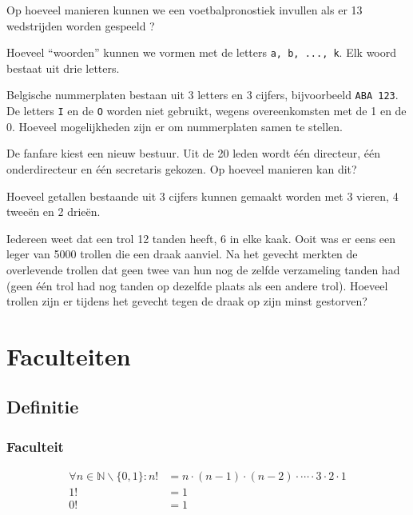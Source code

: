 \documentclass[12pt,a4paper,twoside]{article}
\begin{document}
\begin{oefening}
Op hoeveel manieren kunnen we een voetbalpronostiek invullen als er 13
wedstrijden worden gespeeld ?
\end{oefening}

\begin{oefening}
Hoeveel “woorden” kunnen we vormen met de letters \texttt{a, b, ..., k}. Elk woord
bestaat uit drie letters.
\end{oefening}

\begin{oefening}
Belgische nummerplaten bestaan uit 3 letters en 3 cijfers, bijvoorbeeld \texttt{ABA 123}. De letters \texttt{I} en de \texttt{O} worden niet gebruikt, wegens overeenkomsten met de 1 en de 0. Hoeveel mogelijkheden zijn er om nummerplaten samen te stellen.
\end{oefening}

\begin{oefening} %
De fanfare kiest een nieuw bestuur. Uit de 20 leden wordt één directeur, één onderdirecteur en één secretaris gekozen. Op hoeveel manieren kan dit?
\end{oefening}

\begin{oefening} %
Hoeveel getallen bestaande uit 3 cijfers kunnen gemaakt worden met 3 vieren, 4 tweeën en 2 drieën.
\end{oefening}

\begin{oefening}
Iedereen weet dat een trol 12 tanden heeft, 6 in elke kaak. Ooit was er eens een leger van 5000 trollen die een draak aanviel. Na het gevecht merkten de overlevende trollen dat geen twee van hun nog de zelfde verzameling tanden had (geen één trol had nog tanden op dezelfde plaats als een andere trol). Hoeveel trollen zijn er tijdens het gevecht tegen de draak op zijn minst gestorven?
\end{oefening}

\cleardoublepage
\section{Faculteiten}

\subsection{Definitie}

\subsubsection*{Faculteit}
\begin{mdframed}
\begin{align*}
\forall n \in \mathbb{N}\backslash\{0,1\}: n!&=n\cdot(n-1)\cdot(n-2)\cdot \cdots \cdot 3\cdot2\cdot1\\
                           1!&=1\\
                           0!&=1\\
\end{align*}
\end{mdframed}
\end{document}
